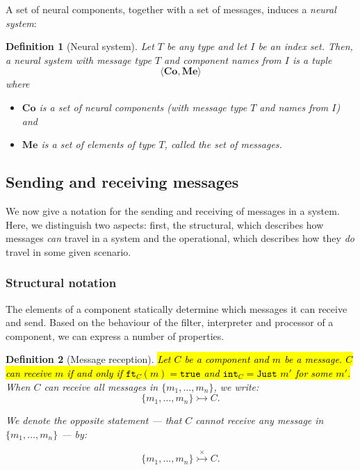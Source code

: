 \documentclass[]{scrartcl}
\theoremstyle{break}
\newtheorem{definition}{Definition}
\renewcommand{\tt}[1]{\texttt{#1}}
\newcommand{\canrec}[2]{\{#1\} \rightarrowtail #2}
\newcommand{\cantrec}[2]{\{#1\} \stackrel{\times}{\rightarrowtail} #2}
\newcommand{\ft}[1]{\tt{ft}_{#1}}
\renewcommand{\int}[1]{\tt{int}_{#1}}
\begin{document}
\noindent
A set of neural components, together with a set of messages, induces a {\em neural system}:

\begin{shaded}
\begin{definition}[Neural system]
	Let $T$ be any type and let $I$ be an index set. Then, a neural system with message type $T$ and component names from $I$ is a tuple
	$$
		\langle \textbf{Co}, \textbf{Me} \rangle
	$$
	where
	\begin{itemize}
		\item $\textbf{Co}$ is a set of neural components (with message type $T$ and names from $I$) and
		\item $\textbf{Me}$ is a set of elements of type $T$, called the {\em set of messages}.
	\end{itemize}
\end{definition}
\end{shaded}

\subsection{Sending and receiving messages}\label{sec:notation}

We now give a notation for the sending and receiving of messages in a system. Here, we distinguish two aspects: first, the structural, which describes how messages {\em can} travel in a system and the operational, which describes how they {\em do} travel in some given scenario.

\subsubsection{Structural notation}

The elements of a component statically determine which messages it can receive and send. Based on the behaviour of the filter, interpreter and processor of a component, we can express a number of properties.

\begin{definition}[Message reception]
	\hl{Let $C$ be a component and $m$ be a message. $C$ can receive $m$ if and only if $\ft{C}(m) = \tt{true}$ and $\int{C} = \tt{Just } m'$ for some $m'$.}
	When $C$ can receive all messages in $\{m_1,\dots,m_n\}$, we write:
	$$
		\canrec{m_1,\dots,m_n}{C}.
	$$
	
	We denote the opposite statement --- that $C$ cannot receive any message in $\{m_1,\dots,m_n\}$ --- by:
	
	$$
		\cantrec{m_1,\dots,m_n}{C}.
	$$
\end{definition}
\end{document}
